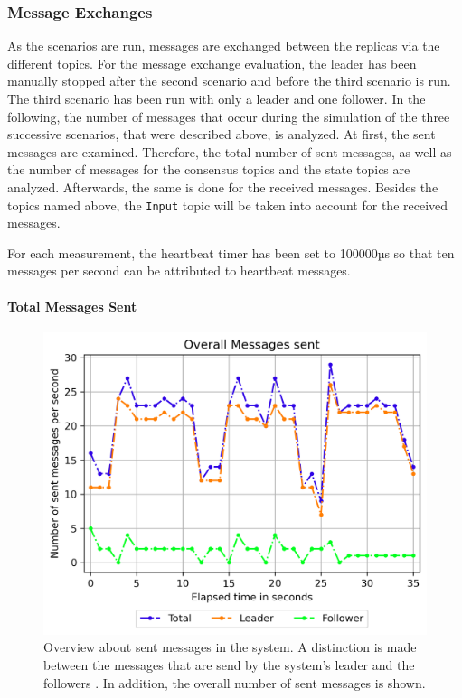 \subsubsection{Message Exchanges}
As the scenarios are run, messages are exchanged between the replicas via the different  topics.
For the message exchange evaluation, the leader has been manually stopped after the second scenario and before the third scenario is run.
The third scenario has been run with only a leader and one follower.
In the following, the number of messages that occur during the simulation of the three successive scenarios, that were described above, is analyzed.
At first, the sent messages are examined.
Therefore, the total number of sent messages, as well as the number of messages for the consensus topics and the state topics are analyzed.
Afterwards, the same is done for the received messages.
Besides the topics named above, the \texttt{Input} topic will be taken into account for the received messages.

For each measurement, the heartbeat timer has been set to 100000µs so that ten messages per second can be attributed to heartbeat messages.

\paragraph{Total Messages Sent}

\begin{figure}[!hb]
	\centering
	\includegraphics[width=0.75\linewidth]{images/plots/TotalMessagesSent}
	\caption{Overview about sent messages in the system. A distinction is made between the messages that are send by the system's leader and the followers . In addition, the overall number of sent messages is shown.}
	\label{fig:PlotTotalMessagesSent}
\end{figure}

